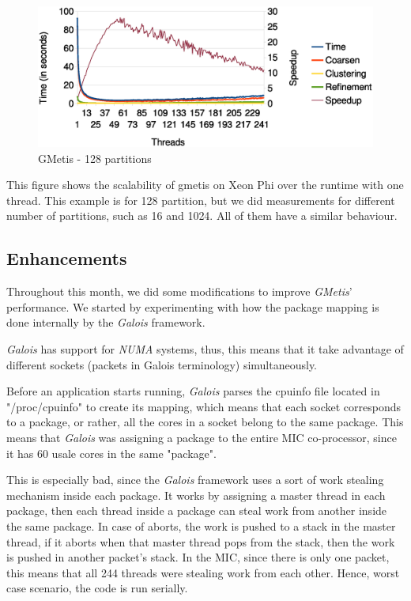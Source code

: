 \documentclass[abstract=on,9pt,twocolumn]{scrartcl}
\begin{document}
\begin{center}
\begin{figure}[htb]
    \includegraphics[width=\columnwidth]{img/gmetis128.eps}
    \caption{GMetis - 128 partitions}
    \label{gmetis128}
\end{figure}
\end{center}

This figure shows the scalability of gmetis on Xeon Phi over the runtime
with one thread. This example is for 128 partition, but we did
measurements for different number of partitions, such as 16 and 1024. All
of them have a similar behaviour.


\subsection{Enhancements}

Throughout this month, we did some modifications to improve
\textit{GMetis}' performance. We started by experimenting with how the package mapping
is done internally by the \textit{Galois} framework.

\textit{Galois} has support for \textit{NUMA} systems, thus, this means that
it take advantage of different sockets (packets in Galois terminology) simultaneously.

Before an application starts running, \textit{Galois} parses the
cpuinfo file located in "/proc/cpuinfo" to create its mapping, which means that each socket
corresponds to a package, or rather, all the cores in a socket belong to the same package.
This means that \textit{Galois} was assigning a package to the entire MIC co-processor, since it has 60 usale cores in the same "package".

This is especially bad, since the \textit{Galois} framework uses a sort of work stealing mechanism inside each package. It works by assigning a master thread in each package, then each thread inside a package can steal work from another inside the same package. In case of aborts, the work is pushed to a stack in the master thread, if it aborts when that master thread pops from the stack, then the work is pushed in another packet's stack. In the MIC, since there is only one packet, this means that all 244 threads were stealing work from each other. Hence, worst case scenario, the code is run serially. 
\end{document}
